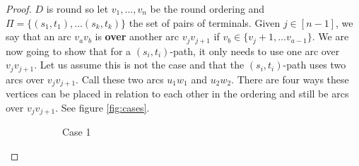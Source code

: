 \begin{proof}
    $D$ is round so let $v_1,\dots ,v_n$ be the round ordering and $\Pi = \lbrace (s_1,t_1), \dots (s_k,t_k)\rbrace$ the set of pairs of terminals.
    Given $j\in [n-1]$, we say that an arc $v_av_b$ is \textbf{over} another arc $v_jv_{j+1}$ if $v_b\in \lbrace v_j+1,\dots v_{a-1}\rbrace$. 
    We are now going to show that for a $(s_i,t_i)$-path, it only needs to use one arc over $v_jv_{j+1}$. 
    Let us assume this is not the case and that the $(s_i,t_i)$-path uses two arcs over $v_jv_{j+1}$. 
    Call these two arcs $u_1w_1$ and $u_2w_2$. 
    There are four ways these vertices can be placed in relation to each other in the ordering and still be arcs over $v_jv_{j+1}$. See figure \autoref{fig:cases}.
    \begin{figure}
        \begin{subfigure}[b]{0.49\textwidth}
            \centering
        \caption{Case 1}
        \end{subfigure}
        \begin{subfigure}[b]{0.49\textwidth}
            \centering
\end{subfigure}
\end{figure}
\end{proof}
